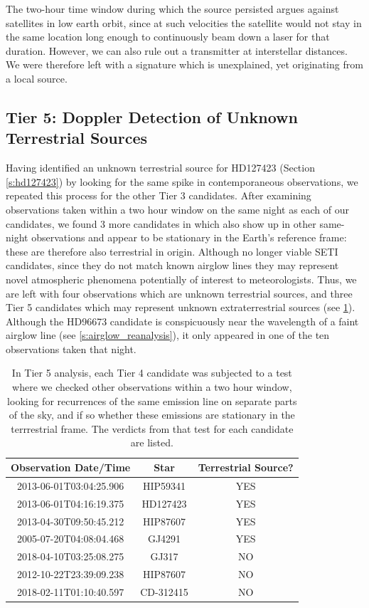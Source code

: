 \documentclass[twocolumn]{aastex701}
\begin{document}
The two-hour time window during which the source persisted argues against satellites in low earth orbit, since at such velocities the satellite would not stay in the same location long enough to continuously beam down a laser for that duration. However, we can also rule out a transmitter at interstellar distances. We were therefore left with a signature which is unexplained, yet originating from a local source. 

\subsection{Tier 5: Doppler Detection of Unknown Terrestrial Sources}
\label{s:doppler}
Having identified an unknown terrestrial source for HD127423 (Section \ref{s:hd127423}) by looking for the same spike in contemporaneous observations,  we repeated this process for the other Tier 3 candidates.  After examining observations taken within a two hour window on the same night as each of our candidates, we found 3 more candidates in which also show up in other same-night observations and appear to be stationary in the Earth's reference frame: these are therefore also terrestrial in origin.  Although no longer viable SETI candidates, since they do not match known airglow lines they may represent novel atmospheric phenomena potentially of interest to meteorologists. Thus, we are left with four observations which are unknown terrestrial sources, and three Tier 5 candidates which may represent unknown extraterrestrial sources (see \ref{tab:terrestrial_or_extraterrestrial}). Although the HD96673 candidate is conspicuously near the wavelength of a faint airglow line (see \ref{s:airglow_reanalysis}), it only appeared in one of the ten observations taken that night.  

\begin{table}
    \centering
    \begin{tabular}{|c|c|c|}
    \hline
        Observation Date/Time  & Star & Terrestrial Source? \\
    \hline
       2013-06-01T03:04:25.906 & HIP59341 & YES \\
       2013-06-01T04:16:19.375 & HD127423 & YES \\
       2013-04-30T09:50:45.212 & HIP87607 & YES \\
       2005-07-20T04:08:04.468 & GJ4291 & YES \\
       2018-04-10T03:25:08.275 & GJ317 & NO \\
       2012-10-22T23:39:09.238 & HIP87607 & NO \\
       2018-02-11T01:10:40.597 & CD-312415 & NO \\
    \hline
    \end{tabular}
    \caption{In Tier 5 analysis, each Tier 4 candidate was subjected to a test where we checked other observations within a two hour window, looking for recurrences of the same emission line on separate parts of the sky, and if so whether these emissions are stationary in the terrrestrial frame. The verdicts from that test for each candidate are listed.}
    \label{tab:terrestrial_or_extraterrestrial}
\end{table}
\end{document}
